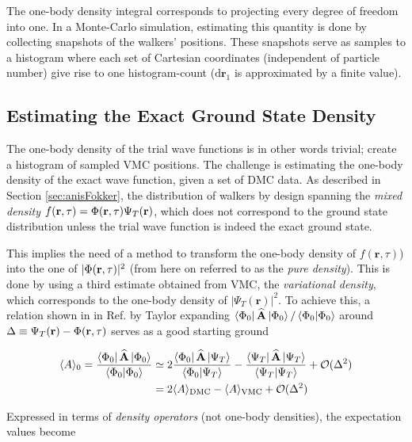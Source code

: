 The one-body density integral corresponds to projecting every degree of freedom into one. In a Monte-Carlo simulation, estimating this quantity is done by collecting snapshots of the walkers' positions. These snapshots serve as samples to a histogram where each set of Cartesian coordinates (independent of particle number) give rise to one histogram-count ($\mathrm{d}\mathbf{r}_1$ is approximated by a finite value).

\subsection{Estimating the Exact Ground State Density}

The one-body density of the trial wave functions is in other words trivial; create a histogram of sampled VMC positions. The challenge is estimating the one-body density of the exact wave function, given a set of DMC data. As described in Section \ref{sec:anisFokker}, the distribution of walkers by design spanning the \textit{mixed density} $f(\mathbf{r}, \tau) = \Phi(\mathbf{r}, \tau)\Psi_T(\mathbf{r})$, which does not correspond to the ground state distribution unless the trial wave function is indeed the exact ground state. 

This implies the need of a method to transform the one-body density of $f(\mathbf{r}, \tau)$) into the one of $|\Phi(\mathbf{r}, \tau)|^2$ (from here on referred to as the \textit{pure density}). This is done by using a third estimate obtained from VMC, the \textit{variational density}, which corresponds to the one-body density of $|\Psi_T(\mathbf{r})|^2$. To achieve this, a relation shown in in Ref. \cite{abInitioMC} by Taylor expanding $\left< \Phi_0 \right|{\bf\widehat{A}}\left| \Phi_0 \right>/\left\langle \Phi_0 | \Phi_0\right\rangle$ around $\Delta \equiv \Psi_T(\mathbf{r}) - \Phi(\mathbf{r}, \tau)$ serves as a good starting ground

\begin{align}
 \langle A \rangle_0 = \frac{\left< \Phi_0 \right|{\bf\widehat{A}}\left| \Phi_0 \right>}{\left\langle \Phi_0 | \Phi_0\right\rangle} &\simeq  2\frac{\left< \Phi_0 \right|{\bf\widehat{A}}\left| \Psi_T \right>}{\left\langle \Phi_0 | \Psi_T\right\rangle} -  \frac{\left< \Psi_T \right|{\bf\widehat{A}}\left| \Psi_T \right>}{\left\langle \Psi_T | \Psi_T\right\rangle} + \mathcal{O}(\Delta^2)\notag\\
  &= 2\langle A \rangle_\mathrm{DMC} - \langle A \rangle_\mathrm{VMC}  + \mathcal{O}(\Delta^2) \label{eq:PureEstimRelat}
\end{align}

Expressed in terms of \textit{density operators} (not one-body densities), the expectation values become

\newcommand{\tr}{\mathrm{tr}}

